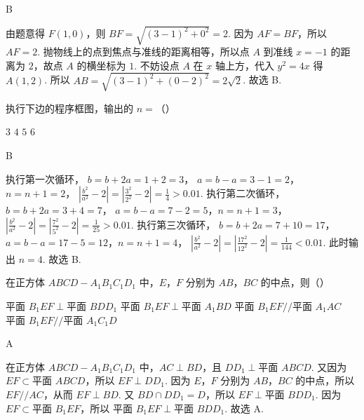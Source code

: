 \begin{answer}
B
\end{answer}

\begin{solution}
由题意得 \(F(1,0)\)，则
\(BF=\sqrt{\left( 3-1 \right)^2+0^2}=2\).
因为 \(AF=BF\)，所以 \(AF=2\).
抛物线上的点到焦点与准线的距离相等，所以点 \(A\) 到准线 \(x=-1\) 的距离为 \(2\)，故点 \(A\) 的横坐标为 \(1\).
不妨设点 \(A\) 在 \(x\) 轴上方，代入 \(y^2=4x\) 得 \(A(1,2)\).
所以
\(AB=\sqrt{\left( 3-1 \right)^2+\left( 0-2 \right)^2}=2\sqrt{2}\).
故选 B.
\end{solution}

\begin{problem}
执行下边的程序框图，输出的 \(n=\)（\quad）


\choices
    {\(3\)}
    {\(4\)}
    {\(5\)}
    {\(6\)}
\end{problem}

\begin{answer}
B
\end{answer}

\begin{solution}
执行第一次循环，
\(b=b+2a=1+2=3\)，
\(a=b-a=3-1=2\)，\(n=n+1=2\)，
\(\left| \frac{b^2}{a^2}-2 \right| =\left| \frac{3^2}{2^2}-2 \right| =\frac{1}{4}>0.01\).
执行第二次循环，
\(b=b+2a=3+4=7\)，
\(a=b-a=7-2=5\)，\(n=n+1=3\)，
\(\left| \frac{b^2}{a^2}-2 \right| =\left| \frac{7^2}{5^2}-2 \right| =\frac{1}{25}>0.01\).
执行第三次循环，
\(b=b+2a=7+10=17\)，
\(a=b-a=17-5=12\)，\(n=n+1=4\)，
\(\left| \frac{b^2}{a^2}-2 \right| =\left| \frac{17^2}{12^2}-2 \right| =\frac{1}{144}<0.01\).
此时输出 \(n=4\).
故选 B.
\end{solution}

\begin{problem}
在正方体 \(ABCD-A_1B_1C_1D_1\) 中，\(E\)，\(F\) 分别为 \(AB\)，\(BC\) 的中点，则（\quad）

\choices
    {\(\text{平面 }B_1EF\perp \text{平面 }BDD_1\)}
    {\(\text{平面 }B_1EF\perp \text{平面 }A_1BD\)}
    {\(\text{平面 }B_1EF // \text{平面 }A_1AC\)}
    {\(\text{平面 }B_1EF // \text{平面 }A_1C_1D\)}
\end{problem}

\begin{answer}
A
\end{answer}

\begin{solution}
在正方体 \(ABCD-A_1B_1C_1D_1\) 中，\(AC\perp BD\)，且 \(DD_1\perp \text{平面 }ABCD\).
又因为 \(EF\subset \text{平面 }ABCD\)，所以 \(EF\perp DD_1\).
因为 \(E\)，\(F\) 分别为 \(AB\)，\(BC\) 的中点，所以 \(EF // AC\)，从而 \(EF\perp BD\).
又 \(BD\cap DD_1=D\)，所以 \(EF\perp \text{平面 }BDD_1\).
因为 \(EF\subset \text{平面 }B_1EF\)，所以 \(\text{平面 }B_1EF\perp \text{平面 }BDD_1\).
故选 A.
\end{solution}

